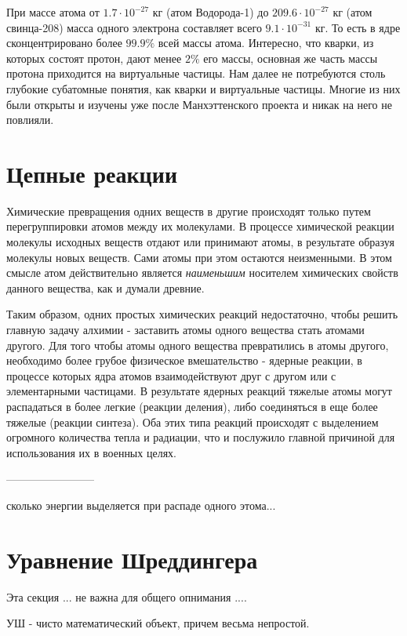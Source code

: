 При массе атома от $1.7\cdot 10^{-27}$ кг (атом Водорода-1) до $209.6\cdot 10^{-27}$ кг (атом свинца-208) масса одного электрона составляет всего $9.1\cdot 10^{-31}$ кг.
То есть в ядре сконцентрировано более $99.9\%$ всей массы атома.
Интересно, что кварки, из которых состоят протон, дают менее $2\%$ его массы, основная же часть массы протона приходится на виртуальные частицы.
Нам далее не потребуются столь глубокие субатомные понятия, как кварки и виртуальные частицы. 
Многие из них были открыты и изучены уже после Манхэттенского проекта и никак на него не повлияли. 


\section*{Цепные реакции}

Химические превращения одних веществ в другие происходят только путем перегруппировки атомов между их молекулами.
В процессе химической реакции молекулы исходных веществ отдают или принимают атомы, в результате образуя молекулы новых веществ. 
Сами атомы при этом остаются неизменными.
В этом смысле атом действительно является \textit{наименьшим} носителем химических свойств данного вещества, как и думали древние.

Таким образом, одних простых химических реакций недостаточно, чтобы решить главную задачу алхимии - заставить атомы одного вещества стать атомами другого.
Для того чтобы атомы одного вещества превратились в атомы другого, необходимо более грубое физическое вмешательство - ядерные реакции, в процессе которых ядра атомов взаимодействуют друг с другом или с элементарными частицами.
В результате ядерных реакций тяжелые атомы могут распадаться в более легкие (реакции деления), либо соединяться в еще более тяжелые (реакции синтеза).
Оба этих типа реакций происходят с выделением огромного количества тепла и радиации, что и послужило главной причиной для использования их в военных целях.

------------------------

сколько энергии выделяется при распаде одного этома...


\section*{Уравнение Шреддингера}

Эта секция ... не важна для общего опнимания ....

УШ - чисто математический объект, причем весьма непростой.

